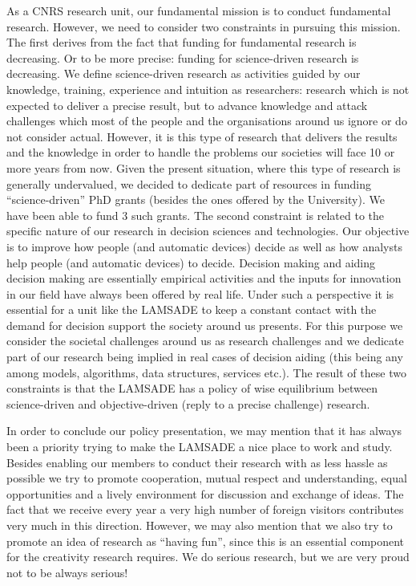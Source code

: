 As a CNRS research unit, our fundamental mission is to conduct fundamental research. However, we need to consider two constraints in pursuing this mission. The first derives from the fact that funding for fundamental research is decreasing. Or to be more precise: funding for science-driven research is decreasing. We define science-driven research as activities guided by our knowledge, training, experience and intuition as researchers: research which is not expected to deliver a precise result, but to advance knowledge and attack challenges which most of the people and the organisations around us ignore or do not consider actual. However, it is this type of research that delivers the results and the knowledge in order to handle the problems our societies will face 10 or more years from now. Given the present situation, where this type of research is generally undervalued, we decided to dedicate part of resources in funding ``science-driven'' PhD grants (besides the ones offered by the University). We have been able to fund 3 such grants. The second constraint is related to the specific nature of our research in decision sciences and technologies. Our objective is to improve how people (and automatic devices) decide as well as how analysts help people (and automatic devices) to decide. Decision making and aiding decision making are essentially empirical activities and the inputs for innovation in our field have always been offered by real life. Under such a perspective it is essential for a unit like the LAMSADE to keep a constant contact with the demand for decision support the society around us presents. For this purpose we consider the societal challenges around us as research challenges and we dedicate part of our research being implied in real cases of decision aiding (this being any among models, algorithms, data structures, services etc.). The result of these two constraints is that the LAMSADE has a policy of wise equilibrium between science-driven and objective-driven (reply to a precise challenge) research.

In order to conclude our policy presentation, we may mention that it has always been a priority trying to make the LAMSADE a nice place to work and study. Besides enabling our members to conduct their research with as less hassle as possible we try to promote cooperation, mutual respect and understanding, equal opportunities and a lively environment for discussion and exchange of ideas. The fact that we receive every year a very high number of foreign visitors contributes very much in this direction. However, we may also mention that we also try to promote an idea of research as ``having fun'', since this is an essential component for the creativity research requires. We do serious research, but we are very proud not to be always serious!

